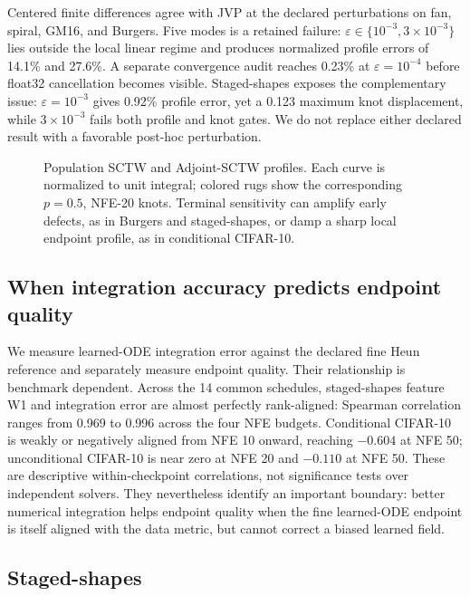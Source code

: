 Centered finite differences agree with JVP at the declared perturbations on fan, spiral, GM16, and
Burgers. Five modes is a retained failure: $\varepsilon\in\{10^{-3},3\times10^{-3}\}$ lies outside
the local linear regime and produces normalized profile errors of 14.1\% and 27.6\%. A separate
convergence audit reaches 0.23\% at $\varepsilon=10^{-4}$ before float32 cancellation becomes
visible. Staged-shapes exposes the complementary issue: $\varepsilon=10^{-3}$ gives 0.92\%
profile error, yet a 0.123 maximum knot displacement, while
$3\times10^{-3}$ fails both profile and knot gates. We do not replace either declared result with
a favorable post-hoc perturbation.

\begin{figure}[t]
  \centering
  \caption{Population SCTW and Adjoint-SCTW profiles. Each curve is normalized to unit integral;
  colored rugs show the corresponding $p=0.5$, NFE-20 knots. Terminal sensitivity can amplify
  early defects, as in Burgers and staged-shapes, or damp a sharp local endpoint profile, as in
  conditional CIFAR-10.}
  \label{fig:profile-comparison}
\end{figure}

\subsection{When integration accuracy predicts endpoint quality}
\label{sec:alignment-results}

We measure learned-ODE integration error against the declared fine Heun reference and separately
measure endpoint quality. Their relationship is benchmark dependent. Across the 14 common
schedules, staged-shapes feature W1 and integration error are almost perfectly rank-aligned:
Spearman correlation ranges from 0.969 to 0.996 across the four NFE budgets. Conditional CIFAR-10
is weakly or negatively aligned from NFE 10 onward, reaching $-0.604$ at NFE 50; unconditional
CIFAR-10 is near zero at NFE 20 and $-0.110$ at NFE 50. These are descriptive within-checkpoint
correlations, not significance tests over independent solvers. They nevertheless identify an
important boundary: better numerical integration helps endpoint quality when the fine learned-ODE
endpoint is itself aligned with the data metric, but cannot correct a biased learned field.

\subsection{Staged-shapes}
\label{sec:staged-results}

